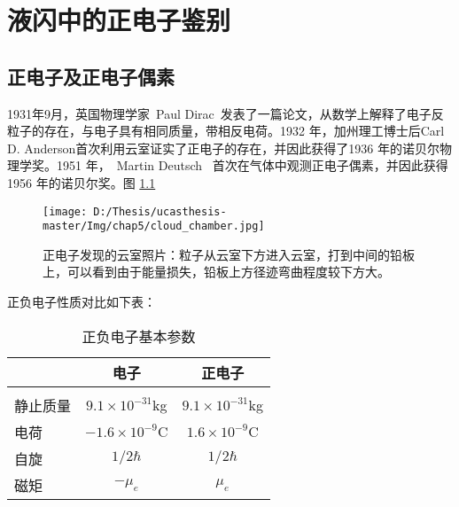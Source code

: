 
\chapter{液闪中的正电子鉴别}
\label{chap:chap5}
\section{正电子及正电子偶素}
1931年9月，英国物理学家~Paul Dirac~发表了一篇论文，从数学上解释了电子反粒子的存在，与电子具有相同质量，带相反电荷。1932 年，加州理工博士后Carl D. Anderson首次利用云室证实了正电子的存在，并因此获得了1936 年的诺贝尔物理学奖。1951 年，~Martin Deutsch~ 首次在气体中观测正电子偶素，并因此获得1956 年的诺贝尔奖。图 \ref{fig:p51}
\begin{figure}[!htbp]
  \centering
  \texttt{[image: D:/Thesis/ucasthesis-master/Img/chap5/cloud\_chamber.jpg]}
  \caption{正电子发现的云室照片：粒子从云室下方进入云室，打到中间的铅板上，可以看到由于能量损失，铅板上方径迹弯曲程度较下方大。}
  \label{fig:p51}
\end{figure}

正负电子性质对比如下表：
\begin{table}[htbp]
\centering  %
\begin{tabular}{lcc}  %
\hline
&电子&正电子 \\ \hline  %
\\ 静止质量&$9.1\times10^{-31}$kg& $9.1\times10^{-31}$kg       %
\\  电荷&$-1.6\times10^{-9}$C& $1.6\times10^{-9}$C    %
\\自旋&$1/2\hbar$&$1/2\hbar$
\\磁矩&$-\mu_{e}$&$\mu_{e}$
\\ \hline
\end{tabular}
\caption{正负电子基本参数}
\end{table}

